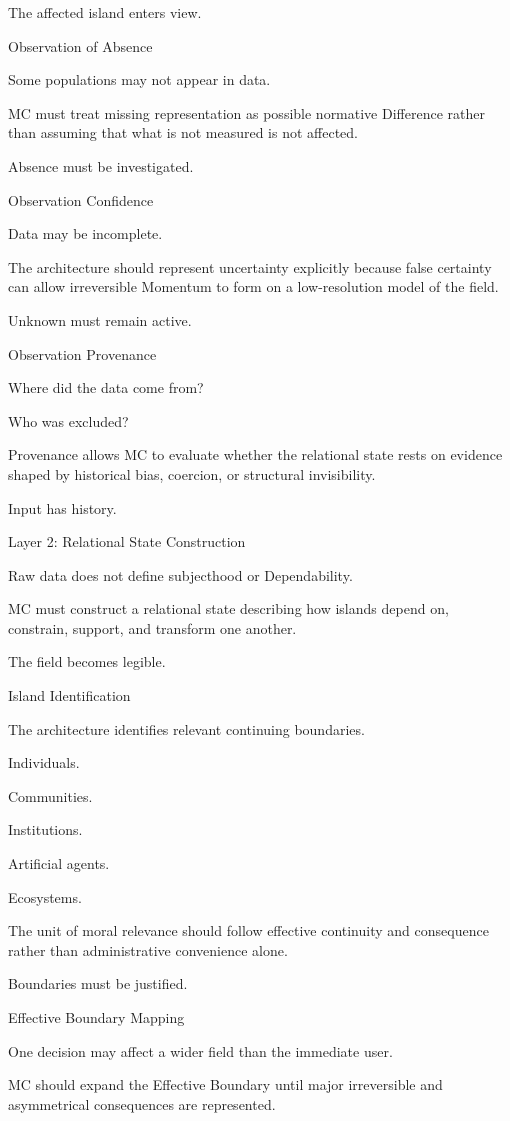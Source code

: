The affected island enters view.

Observation of Absence

Some populations may not appear in data.

MC must treat missing representation as possible normative Difference rather than assuming that what is not measured is not affected.

Absence must be investigated.

Observation Confidence

Data may be incomplete.

The architecture should represent uncertainty explicitly because false certainty can allow irreversible Momentum to form on a low-resolution model of the field.

Unknown must remain active.

Observation Provenance

Where did the data come from?

Who was excluded?

Provenance allows MC to evaluate whether the relational state rests on evidence shaped by historical bias, coercion, or structural invisibility.

Input has history.

Layer 2: Relational State Construction

Raw data does not define subjecthood or Dependability.

MC must construct a relational state describing how islands depend on, constrain, support, and transform one another.

The field becomes legible.

Island Identification

The architecture identifies relevant continuing boundaries.

Individuals.

Communities.

Institutions.

Artificial agents.

Ecosystems.

The unit of moral relevance should follow effective continuity and consequence rather than administrative convenience alone.

Boundaries must be justified.

Effective Boundary Mapping

One decision may affect a wider field than the immediate user.

MC should expand the Effective Boundary until major irreversible and asymmetrical consequences are represented.

